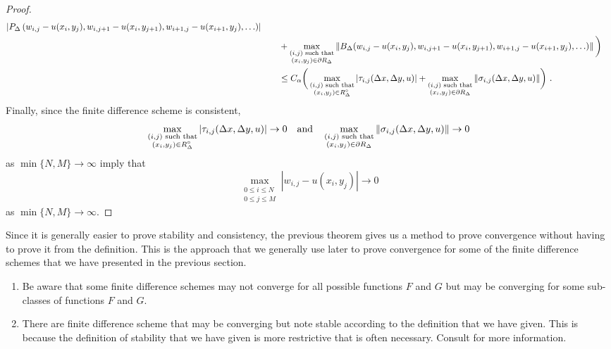 \begin{proof}
\begin{align*}
\left| P_\Delta\left(w_{i,j}-u(x_i,y_j), w_{i,j+1}-u(x_i,y_{j+1}),
w_{i+1,j}- u(x_{i+1},y_j),\ldots\right) \right| \\
&\qquad
+ \max_{\substack{(i,j) \text{ such that}\\ (x_i,y_j)\in \partial R_\Delta}}
\left\| B_\Delta(w_{i,j}-u(x_i,y_j),w_{i,j+1}-u(x_i,y_{j+1}),w_{i+1,j}
  -u(x_{i+1},y_j), \ldots) \right\| \bigg) \\
& \qquad \leq C_\alpha \bigg(
\max_{\substack{(i,j) \text{ such that}\\(x_i,y_j) \in R^\circ_\Delta}}
|\tau_{i,j}(\Delta{x},\Delta{y},u)|
+\max_{\substack{(i,j) \text{ such that}\\(x_i,y_j) \in \partial R_\Delta}}
\|\sigma_{i,j}(\Delta{x},\Delta{y},u)\| \bigg) \ .
\end{align*}
Finally, since the finite difference scheme is consistent,
\[
\max_{\substack{(i,j) \text{ such that}\\(x_i,y_j) \in R^\circ_\Delta}}
|\tau_{i,j}(\Delta{x},\Delta{y},u)| \to 0 \quad \text{and} \quad
\max_{\substack{(i,j) \text{ such that}\\(x_i,y_j) \in \partial R_\Delta}}
\|\sigma_{i,j}(\Delta{x},\Delta{y},u)\| \to 0
\]
as $\min \{N, M\} \rightarrow \infty$ imply that
\[
\max_{\substack{0\leq i\leq N\\0\leq j \leq M}} |w_{i,j} - u(x_i,y_j)|
\to 0
\]
as $\min \{N, M\} \rightarrow \infty$.
\end{proof}

Since it is generally easier to prove stability and consistency, the
previous theorem gives us a method to prove convergence without having
to prove it from the definition.  This is the approach that we
generally use later to prove convergence for some of the finite
difference schemes that we have presented in the previous section.

\begin{rmkList}
\begin{enumerate}
\item Be aware that some finite difference schemes may not converge
for all possible functions $F$ and $G$ but may be converging for some
sub-classes of functions $F$ and $G$.
\item There are finite difference scheme that may be converging but
note stable according to the definition that we have given.  This is
because the definition of stability that we have given is more
restrictive that is often necessary.  Consult \cite{IK} for more
information.
\end{enumerate}
\end{rmkList}

